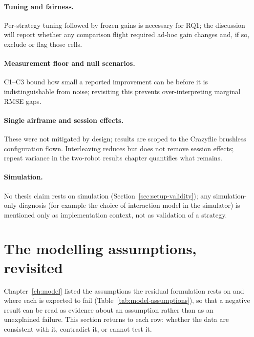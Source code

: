 \paragraph{Tuning and fairness.} Per-strategy tuning followed by frozen gains is necessary for RQ1;
the discussion will report whether any comparison flight required ad-hoc gain changes and, if so,
exclude or flag those cells.

\paragraph{Measurement floor and null scenarios.} C1--C3 bound how small a reported improvement can
be before it is indistinguishable from noise; revisiting this prevents over-interpreting marginal
RMSE gaps.

\paragraph{Single airframe and session effects.} These were not mitigated by design; results are
scoped to the Crazyflie brushless configuration flown. Interleaving reduces but does not remove
session effects; repeat variance in the two-robot results chapter quantifies what remains.

\paragraph{Simulation.} No thesis claim rests on simulation (Section~\ref{sec:setup-validity});
any simulation-only diagnosis (for example the choice of interaction model in the simulator) is
mentioned only as implementation context, not as validation of a strategy.


\section{The modelling assumptions, revisited}
\label{sec:disc-assumptions}

Chapter~\ref{ch:model} listed the assumptions the residual formulation rests on and where each is
expected to fail (Table~\ref{tab:model-assumptions}), so that a negative result can be read as
evidence about an assumption rather than as an unexplained failure. This section returns to each
row: whether the data are consistent with it, contradict it, or cannot test it.

